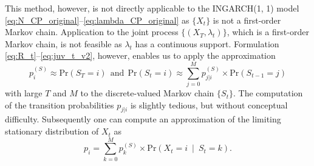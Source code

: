 \documentclass[review]{elsarticle}
\begin{document}
This method, however, is not directly applicable to the INGARCH(1, 1) model \eqref{eq:N_CP_original}--\eqref{eq:lambda_CP_original} as $\{X_t\}$ is not a first-order Markov chain. Application to the joint process $\{(X_T, \lambda_t)\}$, which is a first-order Markov chain, is not feasible as $\lambda_t$ has a continuous support. Formulation \eqref{eq:R_t}--\eqref{eq:juv_t_v2}, however, enables us to apply the approximation
$$
p^{(S)}_i \approx \text{Pr}(S_T = i) \ \ \text{and} \ \ \text{Pr}(S_t = i) \approx \sum_{j = 0}^M p^{(S)}_{j|i} \times \text{Pr}(S_{t - 1} = j)
$$
with large $T$ and $M$ to the discrete-valued Markov chain $\{S_t\}$. The computation of the transition probabilities $p_{j|i}$ is slightly tedious, but without conceptual difficulty. Subsequently one can compute an approximation of the limiting stationary distribution of $X_t$ as
$$
p_i = \sum_{k = 0}^M p_k^{(S)} \times \text{Pr}(X_t = i \ \mid \ S_t = k).
$$





\end{document}
